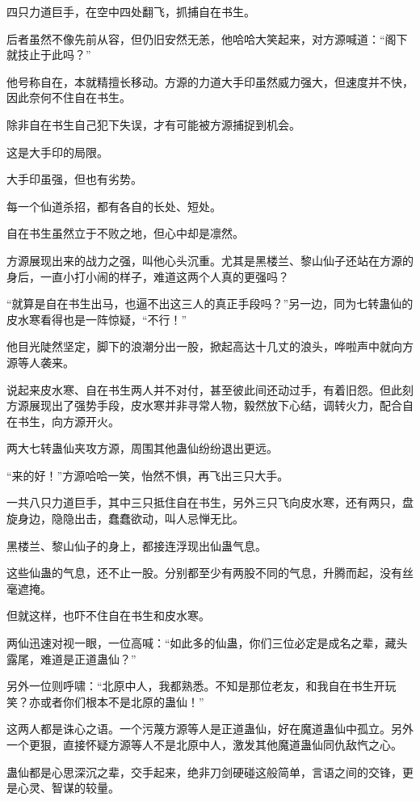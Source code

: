 \begin{this_body}
四只力道巨手，在空中四处翻飞，抓捕自在书生。

后者虽然不像先前从容，但仍旧安然无恙，他哈哈大笑起来，对方源喊道：“阁下就技止于此吗？”

他号称自在，本就精擅长移动。方源的力道大手印虽然威力强大，但速度并不快，因此奈何不住自在书生。

除非自在书生自己犯下失误，才有可能被方源捕捉到机会。

这是大手印的局限。

大手印虽强，但也有劣势。

每一个仙道杀招，都有各自的长处、短处。

自在书生虽然立于不败之地，但心中却是凛然。

方源展现出来的战力之强，叫他心头沉重。尤其是黑楼兰、黎山仙子还站在方源的身后，一直小打小闹的样子，难道这两个人真的更强吗？

“就算是自在书生出马，也逼不出这三人的真正手段吗？”另一边，同为七转蛊仙的皮水寒看得也是一阵惊疑，“不行！”

他目光陡然坚定，脚下的浪潮分出一股，掀起高达十几丈的浪头，哗啦声中就向方源等人袭来。

说起来皮水寒、自在书生两人并不对付，甚至彼此间还动过手，有着旧怨。但此刻方源展现出了强势手段，皮水寒并非寻常人物，毅然放下心结，调转火力，配合自在书生，向方源开火。

两大七转蛊仙夹攻方源，周围其他蛊仙纷纷退出更远。

“来的好！”方源哈哈一笑，怡然不惧，再飞出三只大手。

一共八只力道巨手，其中三只抵住自在书生，另外三只飞向皮水寒，还有两只，盘旋身边，隐隐出击，蠢蠢欲动，叫人忌惮无比。

黑楼兰、黎山仙子的身上，都接连浮现出仙蛊气息。

这些仙蛊的气息，还不止一股。分别都至少有两股不同的气息，升腾而起，没有丝毫遮掩。

但就这样，也吓不住自在书生和皮水寒。

两仙迅速对视一眼，一位高喊：“如此多的仙蛊，你们三位必定是成名之辈，藏头露尾，难道是正道蛊仙？”

另外一位则呼啸：“北原中人，我都熟悉。不知是那位老友，和我自在书生开玩笑？亦或者你们根本不是北原的蛊仙！”

这两人都是诛心之语。一个污蔑方源等人是正道蛊仙，好在魔道蛊仙中孤立。另外一个更狠，直接怀疑方源等人不是北原中人，激发其他魔道蛊仙同仇敌忾之心。

蛊仙都是心思深沉之辈，交手起来，绝非刀剑硬碰这般简单，言语之间的交锋，更是心灵、智谋的较量。

\end{this_body}

